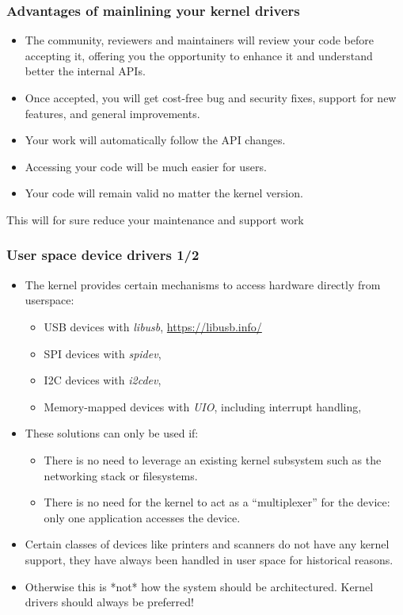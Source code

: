 \begin{frame}
  \frametitle{Advantages of mainlining your kernel drivers}
  \begin{itemize}
  \item The community, reviewers and maintainers will review your code
    before accepting it, offering you the opportunity to enhance it and
    understand better the internal APIs.
  \item Once accepted, you will get cost-free bug and security fixes,
    support for new features, and general improvements.
  \item Your work will automatically follow the API changes.
  \item Accessing your code will be much easier for users.
  \item Your code will remain valid no matter the kernel version.
  \end{itemize}
  This will for sure reduce your maintenance and support work
\end{frame}


\begin{frame}
  \frametitle{User space device drivers 1/2}
  \begin{itemize}
  \item The kernel provides certain mechanisms to access hardware
    directly from userspace:
    \begin{itemize}
    \item USB devices with {\em libusb}, \url{https://libusb.info/}
    \item SPI devices with {\em spidev}, 
    \item I2C devices with {\em i2cdev}, 
    \item Memory-mapped devices with {\em UIO}, including interrupt
      handling, 
    \end{itemize}
  \item These solutions can only be used if:
    \begin{itemize}
    \item There is no need to leverage an existing kernel subsystem
      such as the networking stack or filesystems.
    \item There is no need for the kernel to act as a ``multiplexer''
      for the device: only one application accesses the device.
    \end{itemize}
  \item Certain classes of devices like printers and scanners do not
    have any kernel support, they have always been handled in user space
    for historical reasons.
  \item Otherwise this is *not* how the system should be
    architectured. Kernel drivers should always be preferred!
  \end{itemize}
\end{frame}

